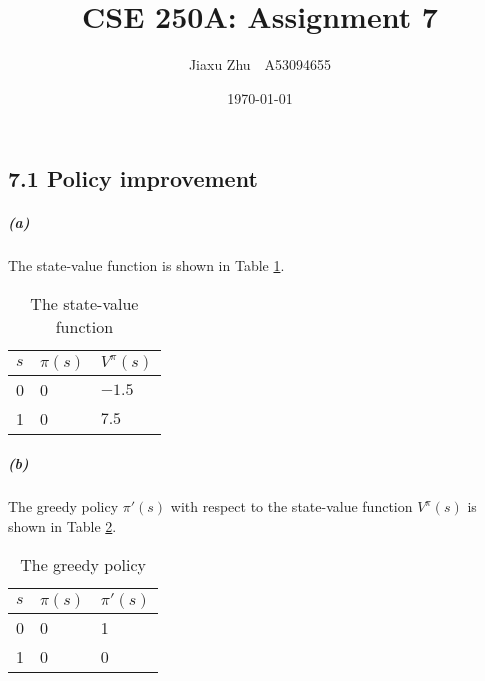 \documentclass{article}
\begin{document}
\title{CSE 250A: Assignment 7}
\author{Jiaxu Zhu~~A53094655}
\date{\today}
\maketitle
\subsection*{7.1 Policy improvement}
\subparagraph*{(a)}
The state-value function is shown in Table \ref{7.1a}.
\begin{table}[h]
	\centering
	\begin{tabular}{|p{2cm}|p{2cm}|p{2cm}|}
		\hline
		$s$ & $\pi(s)$ & $V^\pi(s)$\\
		\hline
		0 & 0 & $-1.5$ \\
		\hline
		1 & 0 & $7.5$ \\
		\hline
	\end{tabular}
	\caption{The state-value function}
	\label{7.1a}
\end{table}

\subparagraph*{(b)}
The greedy policy $\pi'(s)$ with respect to the state-value function $V^\pi(s)$ is shown in Table \ref{7.1b}.
\begin{table}[h]
	\centering
	\begin{tabular}{|p{2cm}|p{2cm}|p{2cm}|}
		\hline
		$s$ & $\pi(s)$ & $\pi'(s)$\\
		\hline
		0 & 0 & 1 \\
		\hline
		1 & 0 & 0 \\
		\hline
	\end{tabular}
	\caption{The greedy policy}
	\label{7.1b}
\end{table}
\end{document}
